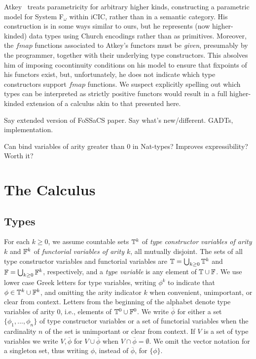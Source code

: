\documentclass{lmcs}
\theoremstyle{plain}\newtheorem{satz}[thm]{Satz}
\begin{document}
Atkey~\cite{atk12} treats parametricity for arbitrary higher kinds,
constructing a parametric model for System F$_\omega$ within iCIC,
rather than in a semantic category. His construction is in some ways
similar to ours, but he represents (now higher-kinded) data types
using Church encodings rather than as primitives. Moreover, the
$\mathit{fmap}$ functions associated to Atkey's functors must be {\em
  given}, presumably by the programmer, together with their underlying
type constructors. This absolves him of imposing cocontinuity
conditions on his model to ensure that fixpoints of his functors
exist, but, unfortunately, he does not indicate which type
constructors support $\mathit{fmap}$ functions. We suspect explicitly
spelling out which types can be interpreted as strictly positive
functors would result in a full higher-kinded extension of a calculus
akin to that presented here.

{\color{red} Say extended version of FoSSaCS paper. Say what's
  new/different. GADTs, implementation.

Can bind variables of arity greater than 0 in Nat-types? Improves
expressibility?  Worth it?}

\section{The Calculus}\label{sec:calculus}

\subsection{Types}
For each $k \ge 0$, we assume countable sets $\mathbb{T}^k$ of \emph{type
  constructor variables of arity $k$} and $\mathbb{F}^k$ of
\emph{functorial variables of arity $k$}, all mutually disjoint.  The
sets of all type constructor variables and functorial variables are
$\mathbb{T} = \bigcup_{k \ge 0} \mathbb{T}^k$ and $\mathbb{F} = \bigcup_{k \ge 0}
\mathbb{F}^k$, respectively, and a \emph{type variable} is any element of
$\mathbb{T} \cup \mathbb{F}$.  We use lower case Greek letters for type
variables, writing $\phi^k$ to indicate that $\phi \in \mathbb{T}^k \cup
\mathbb{F}^k$, and omitting the arity indicator $k$ when convenient,
unimportant, or clear from context. Letters from the beginning of the
alphabet denote type variables of arity $0$, i.e., elements of
$\mathbb{T}^0 \cup \mathbb{F}^0$. We write $\overline{\phi}$ for either a set
$\{\phi_1,...,\phi_n\}$ of type constructor variables or a set of
functorial variables when the cardinality $n$ of the set is
unimportant or clear from context. If $V$ is a set of type variables
we write $V, \overline{\phi}$ for $V \cup \overline{\phi}$ when $V
\cap \overline{\phi} = \emptyset$.  We omit the vector notation for a
singleton set, thus writing $\phi$, instead of $\overline{\phi}$, for
$\{\phi\}$.
\end{document}
